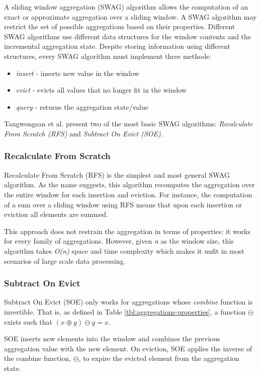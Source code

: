 A sliding window aggregation (SWAG) algorithm allows the computation of an exact or approximate aggregation over a sliding window. A SWAG algorithm may restrict the set of possible aggregations based on their properties. Different SWAG algorithms use different data structures for the window contents and the incremental aggregation state. Despite storing information using different structures, every SWAG algorithm must implement three methods:

\begin{itemize}
    \item \textit{insert} - inserts new value in the window
    \item \textit{evict} - evicts all values that no longer fit in the window
    \item \textit{query} - returns the aggregation state/value
\end{itemize}

Tangwongsan et al. present two of the most basic SWAG algorithms: \textit{Recalculate From Scratch (RFS)} and \textit{Subtract On Evict (SOE)}.

\subsubsection{Recalculate From Scratch}
Recalculate From Scratch (RFS) is the simplest and most general SWAG algorithm. As the name suggests, this algorithm recomputes the aggregation over the entire window for each insertion and eviction. For instance, the computation of a sum over a sliding window using RFS means that upon each insertion or eviction all elements are summed.

This approach does not restrain the aggregation in terms of properties: it works for every family of aggregations. However, given \textit{n} as the window size, this algorithm takes \textit{O(n)} space and time complexity which makes it unfit in most scenarios of large scale data processing. 

\subsubsection{Subtract On Evict}
Subtract On Evict (SOE) only works for aggregations whose  \textit{combine} function is invertible. That is, as defined in Table \ref{tbl:aggregations-properties}, a function $\ominus$ exists such that $(x \oplus y) \ominus y = x$.

SOE inserts new elements into the window and combines the previous aggregation value with the new element. On eviction, SOE applies the inverse of the combine function, $\ominus$, to expire the evicted element from the aggregation state.

